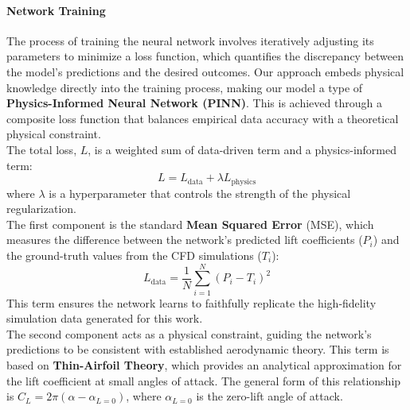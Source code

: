 \paragraph{Network Training}
\label{sec:03_loss}

The process of training the neural network involves iteratively adjusting its parameters to minimize a loss function, which quantifies the discrepancy between the model's predictions and the desired outcomes. Our approach embeds physical knowledge directly into the training process, making our model a type of \textbf{Physics-Informed Neural Network (PINN)}. This is achieved through a composite loss function that balances empirical data accuracy with a theoretical physical constraint.\\

The total loss, $L$, is a weighted sum of data-driven term and a physics-informed term:
\begin{equation}
    L=L_{\text{data}}+\lambda L_{\text{physics}}
\end{equation}
where $\lambda$ is a hyperparameter that controls the strength of the physical regularization.\\

The first component is the standard \textbf{Mean Squared Error} (MSE), which measures the difference between the network's predicted lift coefficients ($P_i$) and the ground-truth values from the CFD simulations ($T_i$):
\begin{equation}
    L_{\text{data}}=\frac 1N\sum_{i=1}^N\left(P_i-T_i\right)^2
\end{equation}
This term ensures the network learns to faithfully replicate the high-fidelity simulation data generated for this work.\\

The second component acts as a physical constraint, guiding the network's predictions to be consistent with established aerodynamic theory. This term is based on \textbf{Thin-Airfoil Theory}, which provides an analytical approximation for the lift coefficient at small angles of attack. The general form of this relationship is $C_L=2\pi(\alpha-\alpha_{L=0})$, where $\alpha_{L=0}$ is the zero-lift angle of attack.\\

